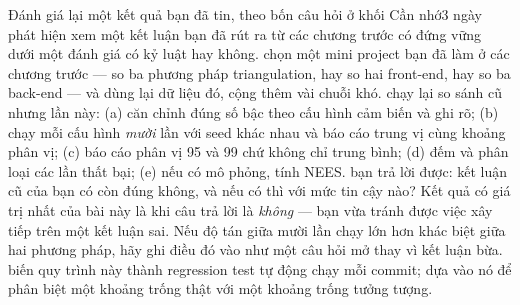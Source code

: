\documentclass[../../vslam.tex]{subfiles}
\begin{document}
\begin{duan}{Đánh giá lại một kết quả bạn đã tin, theo bốn câu hỏi ở khối Cần nhớ}{3 ngày}
\dmt phát hiện xem một kết luận bạn đã rút ra từ các chương trước có đứng vững dưới một đánh giá có kỷ luật hay không.
\ddl chọn một mini project bạn đã làm ở các chương trước --- so ba phương pháp triangulation, hay so hai front-end, hay so ba back-end --- và dùng lại dữ liệu đó, cộng thêm vài chuỗi khó.
\dbc chạy lại so sánh cũ nhưng lần này: (a) căn chỉnh đúng số bậc theo cấu hình cảm biến và ghi rõ; (b) chạy mỗi cấu hình \emph{mười} lần với seed khác nhau và báo cáo trung vị cùng khoảng phân vị; (c) báo cáo phân vị 95 và 99 chứ không chỉ trung bình; (d) đếm và phân loại các lần thất bại; (e) nếu có mô phỏng, tính NEES.
\dxk bạn trả lời được: kết luận cũ của bạn có còn đúng không, và nếu có thì với mức tin cậy nào? Kết quả có giá trị nhất của bài này là khi câu trả lời là \emph{không} --- bạn vừa tránh được việc xây tiếp trên một kết luận sai. Nếu độ tán giữa mười lần chạy lớn hơn khác biệt giữa hai phương pháp, hãy ghi điều đó vào  như một câu hỏi mở thay vì kết luận bừa.
\dnv {} biến quy trình này thành regression test tự động chạy mỗi commit;  dựa vào nó để phân biệt một khoảng trống thật với một khoảng trống tưởng tượng.
\end{duan}
\end{document}
